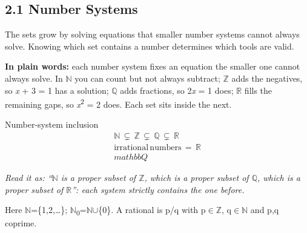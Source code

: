 \documentclass[11pt]{article}
\begin{document}
\begin{keepsection}
\section{2.1 Number Systems}

The sets grow by solving equations that smaller number systems cannot always solve. Knowing which set contains a number determines which tools are valid.

\begin{plainbox}\textbf{In plain words:} each number system fixes an equation the smaller one cannot always solve. In \ensuremath{\mathbb{N}} you can count but not always subtract; \ensuremath{\mathbb{Z}} adds the negatives, so \textit{x} + 3 = 1 has a solution; \ensuremath{\mathbb{Q}} adds fractions, so 2\textit{x} = 1 does; \ensuremath{\mathbb{R}} fills the remaining gaps, so \textit{x}\textsuperscript{2} = 2 does. Each set sits inside the next.\end{plainbox}

\begin{equationcard}{Number-system inclusion}
\[ \begin{gathered} \mathbb{N}\, \subsetneq \, \mathbb{Z}\, \subsetneq \, \mathbb{Q}\, \subsetneq \, \mathbb{R} \\ \text{irrational}\, \text{numbers}\, =\, \mathbb{R}\\mathbb{Q} \end{gathered} \]
{\small \emph{Read it as: “\ensuremath{\mathbb{N}} is a proper subset of \ensuremath{\mathbb{Z}}, which is a proper subset of \ensuremath{\mathbb{Q}}, which is a proper subset of \ensuremath{\mathbb{R}}”: each system strictly contains the one before.}\par Here \ensuremath{\mathbb{N}}=\{1,2,…\}; \ensuremath{\mathbb{N}}\textsubscript{0}=\ensuremath{\mathbb{N}}\ensuremath{\cup}\{0\}. A rational is p/q with p\ensuremath{\in}\ensuremath{\mathbb{Z}}, q\ensuremath{\in}\ensuremath{\mathbb{N}} and p,q coprime.}
\end{equationcard}


\end{keepsection}
\end{document}
